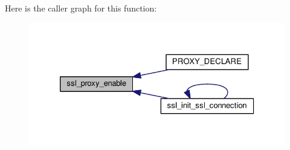 Here is the caller graph for this function\+:
\nopagebreak
\begin{figure}[H]
\begin{center}
\leavevmode
\includegraphics[width=326pt]{group__MOD__SSL__PRIVATE_ga91da4675ca466046f81ee17bee79c10d_icgraph}
\end{center}
\end{figure}


